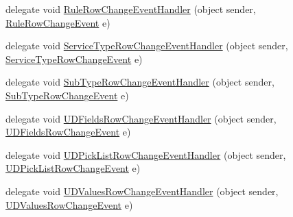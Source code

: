 \begin{DoxyCompactItemize}
delegate void \hyperlink{class_env_int_1_1_win32_1_1_field_tech_1_1_manager_1_1_data_sets_1_1_guide_ware_mobile_data_set_af0c77bdb6e864f191e2dc93da00143ad}{Rule\+Row\+Change\+Event\+Handler} (object sender, \hyperlink{class_env_int_1_1_win32_1_1_field_tech_1_1_manager_1_1_data_sets_1_1_guide_ware_mobile_data_set_1_1_rule_row_change_event}{Rule\+Row\+Change\+Event} e)
\item 
delegate void \hyperlink{class_env_int_1_1_win32_1_1_field_tech_1_1_manager_1_1_data_sets_1_1_guide_ware_mobile_data_set_a8baede567c8baef2eb4b07c41d1b8a0b}{Service\+Type\+Row\+Change\+Event\+Handler} (object sender, \hyperlink{class_env_int_1_1_win32_1_1_field_tech_1_1_manager_1_1_data_sets_1_1_guide_ware_mobile_data_set_ce05812940788b7afd8b26922eaaec12}{Service\+Type\+Row\+Change\+Event} e)
\item 
delegate void \hyperlink{class_env_int_1_1_win32_1_1_field_tech_1_1_manager_1_1_data_sets_1_1_guide_ware_mobile_data_set_a1ba1e2549acaf1c86c08a0e9ca5e836f}{Sub\+Type\+Row\+Change\+Event\+Handler} (object sender, \hyperlink{class_env_int_1_1_win32_1_1_field_tech_1_1_manager_1_1_data_sets_1_1_guide_ware_mobile_data_set_1_1_sub_type_row_change_event}{Sub\+Type\+Row\+Change\+Event} e)
\item 
delegate void \hyperlink{class_env_int_1_1_win32_1_1_field_tech_1_1_manager_1_1_data_sets_1_1_guide_ware_mobile_data_set_a57a79313243866b76d7161614d0382a7}{U\+D\+Fields\+Row\+Change\+Event\+Handler} (object sender, \hyperlink{class_env_int_1_1_win32_1_1_field_tech_1_1_manager_1_1_data_sets_1_1_guide_ware_mobile_data_set_1_1_u_d_fields_row_change_event}{U\+D\+Fields\+Row\+Change\+Event} e)
\item 
delegate void \hyperlink{class_env_int_1_1_win32_1_1_field_tech_1_1_manager_1_1_data_sets_1_1_guide_ware_mobile_data_set_a89db01e03da1252fbc81b1c724a9662c}{U\+D\+Pick\+List\+Row\+Change\+Event\+Handler} (object sender, \hyperlink{class_env_int_1_1_win32_1_1_field_tech_1_1_manager_1_1_data_sets_1_1_guide_ware_mobile_data_set_a32762a7487696410a34ea07d27caf21}{U\+D\+Pick\+List\+Row\+Change\+Event} e)
\item 
delegate void \hyperlink{class_env_int_1_1_win32_1_1_field_tech_1_1_manager_1_1_data_sets_1_1_guide_ware_mobile_data_set_a762a39b6cc28c857aeac9dba9d7dfe11}{U\+D\+Values\+Row\+Change\+Event\+Handler} (object sender, \hyperlink{class_env_int_1_1_win32_1_1_field_tech_1_1_manager_1_1_data_sets_1_1_guide_ware_mobile_data_set_1_1_u_d_values_row_change_event}{U\+D\+Values\+Row\+Change\+Event} e)
\item 

\end{DoxyCompactItemize}
